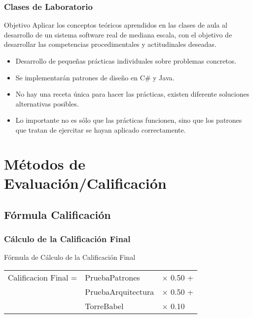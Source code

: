 \documentclass[animated,a4paper,slidestop,xcolor=pst,blue]{beamer}
\begin{document}
\begin{frame}[c]
	\frametitle{Clases de Laboratorio}
	\begin{block}{Objetivo}
        Aplicar los conceptos teóricos aprendidos en las clases de aula al desarrollo de un sistema software real de mediana escala, con el objetivo de desarrollar las competencias procedimentales y actitudinales deseadas.
	\end{block}
	\begin{itemize}
        \item<2-> Desarrollo de pequeñas prácticas individuales sobre problemas concretos.
        \item<3-> Se implementarán patrones de diseño en C\# y Java.
        \item<4-> No hay una receta única para hacer las prácticas, existen diferente soluciones alternativas posibles.
        \item<5-> Lo importante no es sólo que las prácticas funcionen, sino que los patrones que tratan de ejercitar se hayan aplicado correctamente.
	\end{itemize}
\end{frame}

\section{Métodos de Evaluación/Calificación}

\subsection{Fórmula Calificación}

\begin{frame}[c]
	\frametitle{Cálculo de la Calificación Final}
	\begin{block}{Fórmula de Cálculo de la Calificación Final}
		\begin{tabular}{lll}
			Calificacion Final  =  & PruebaPatrones     & $\times$ 0.50 + \\
                                   & PruebaArquitectura & $\times$ 0.50 + \\
                                   & TorreBabel         & $\times$ 0.10 \\
		\end{tabular}
	\end{block}
\end{frame}
\end{document}
